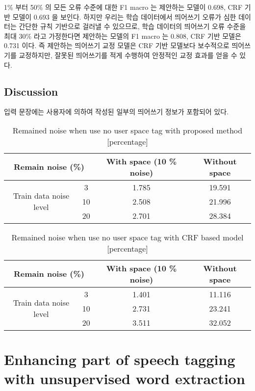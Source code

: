 \documentclass[11pt]{article}
\begin{document}
1\% 부터 50\% 의 모든 오류 수준에 대한 F1 macro 는 제안하는 모델이 0.698, CRF 기반 모델이 0.693 을 보인다.
하지만 우리는 학습 데이터에서 띄어쓰기 오류가 심한 데이터는 간단한 규칙 기반으로 걸러낼 수 있으므로, 학습 데이터의 띄어쓰기 오류 수준을 최대 30\% 라고 가정한다면 제안하는 모델의 F1 macro 는 0.808, CRF 기반 모델은 0.731 이다.
즉 제안하는 띄어쓰기 교정 모델은 CRF 기반 모델보다 보수적으로 띄어쓰기를 교정하지만, 잘못된 띄어쓰기를 적게 수행하여 안정적인 교정 효과를 얻을 수 있다.

\subsection{Discussion}

입력 문장에는 사용자에 의하여 작성된 일부의 띄어쓰기 정보가 포함되어 있다. 

\begin{table}[H]
\centering
\label{tab:no_use_user_space_proposed}
\caption{Remained noise when use no user space tag with proposed method [percentage]}
\begin{tabular}{|c|c|c|c|}
\hline
\multicolumn{2}{|c|}{Remain noise (\%)} & With space (10 \% noise) & Without space \\ \hline
\multirow{3}{*}{Train data noise level} & 3 & 1.785 & 19.591 \\ \cline{2-4} 
 & 10 & 2.508 & 21.996 \\ \cline{2-4} 
 & 20 & 2.701 & 28.384 \\ \hline
\end{tabular}
\end{table}

\begin{table}[H]
\centering
\label{tab:no_use_user_space_crf}
\caption{Remained noise when use no user space tag with CRF based model [percentage]}
\begin{tabular}{|c|c|c|c|}
\hline
\multicolumn{2}{|c|}{Remain noise (\%)} & With space (10 \% noise) & Without space \\ \hline
\multirow{3}{*}{Train data noise level} & 3 & 1.401 & 11.116 \\ \cline{2-4} 
 & 10 & 2.731 & 23.241 \\ \cline{2-4} 
 & 20 & 3.511 & 32.052 \\ \hline
\end{tabular}
\end{table}


\section{Enhancing part of speech tagging with unsupervised word extraction}
\end{document}
